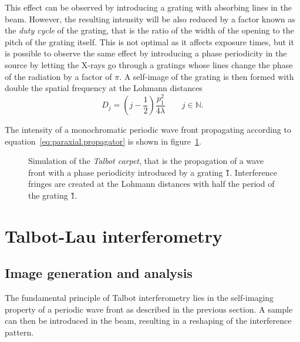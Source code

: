 This effect can be observed by introducing a grating with absorbing lines in
the beam. However, the resulting intensity will be also reduced by a factor
known as the \emph{duty cycle} of the grating, that is the ratio of the
width of the opening to the pitch of the grating itself. This is not optimal
as it affects exposure times, but it is possible to observe the same effect
by introducing a phase periodicity in the source by letting the X-rays
go through a gratings whose lines change the phase of the radiation by a
factor of $\pi$. A self-image of the grating is then formed with double the
spatial frequency at the Lohmann distances~\cite{Lohmann1971}
\begin{equation}
    D_j = \left(j - \frac{1}{2}\right) \frac{p_1^2}{4 \lambda} \qquad
    j\in\mathbb{N}.\label{eq:lohmann-distance}
\end{equation}

The intensity of a monochromatic periodic wave front propagating according to
equation~\eqref{eq:paraxial.propagator} is shown in
figure~\ref{fig:talbotcarpet}.

\begin{figure}[htb]
    \centering
    
    \caption[Talbot carpet.]{Simulation of the \emph{Talbot carpet},
    that is the propagation of a wave front with a phase periodicity
    introduced by a grating \G1.
    Interference fringes are created at the Lohmann distances with half the
period of the grating \G1.}
    \label{fig:talbotcarpet}
\end{figure}

\section{Talbot-Lau interferometry}
\subsection{Image generation and analysis}
The fundamental principle of Talbot interferometry lies in the self-imaging
property of a periodic wave front as described in the previous section. A
sample can then be introduced in the beam, resulting in a reshaping of the
interference pattern.

